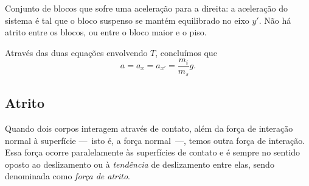 \begin{marginfigure}[-10cm]
\caption{Conjunto de blocos que sofre uma aceleração para a direita: a aceleração do sistema é tal que o bloco suspenso se mantém equilibrado no eixo $y'$. Não há atrito entre os blocos, ou entre o bloco maior e o piso. \label{Fig:BlocoSuspensoAcelerado}}
\end{marginfigure}

\noindent{}Através das duas equações envolvendo $T$, concluímos que
\begin{equation}
    a = a_x = a_{x'}= \frac{m_i}{m_s} g.
\end{equation}

\subsection{Atrito}
\label{Sec:Atrito}

Quando dois corpos interagem através de contato, além da força de interação normal à superfície ---~isto é, a força normal~---, temos outra força de interação. Essa força ocorre paralelamente às superfícies de contato e é sempre no sentido oposto ao deslizamento ou à \emph{tendência} de deslizamento entre elas, sendo denominada como \emph{força de atrito}.

